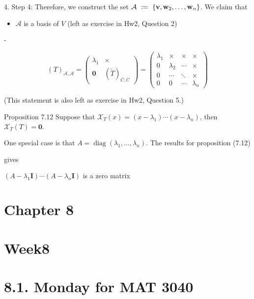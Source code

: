 \documentclass[11pt]{article}
\begin{document}
4. Step 4: Therefore, we construct the set \(\mathcal{A} \mathrel{\text{ := }} \left\{  {\mathbf{v},{\bf w}_2,\ldots ,{\bf w}_n}\right\}\). We claim that

\begin{itemize}
\item \(\mathcal{A}\) is a basis of \(V\) (left as exercise in Hw2, Question 2)
\end{itemize}

-

\[
{\left( T\right) }_{\mathcal{A},\mathcal{A}} = \left( \begin{matrix} {\lambda }_1 &  \times  \\  \mathbf{0} & {\left( \widetilde{T}\right) }_{\bar{C},\bar{C}} \end{matrix}\right)  = \left( \begin{matrix} {\lambda }_1 &  \times  &  \times  &  \times  \\  0 & {\lambda }_2 & \cdots &  \times  \\  0 & \cdots &  \ddots  &  \times  \\  0 & 0 & \cdots & {\lambda }_n \end{matrix}\right)
\]

(This statement is also left as exercise in Hw2, Question 5.)

Proposition 7.12 Suppose that \({\mathcal{X}}_{T}\left( x\right)  = \left( {x - {\lambda }_1}\right) \cdots \left( {x - {\lambda }_n}\right)\), then \({\mathcal{X}}_{T}\left( T\right)  = \mathbf{0}\).

One special case is that \(A = \operatorname{diag}\left( {{\lambda }_1,\ldots ,{\lambda }_n}\right)\). The results for proposition (7.12)

gives

\(\left( {A - {\lambda }_1\mathbf{I}}\right) \cdots \left( {A - {\lambda }_n\mathbf{I}}\right)\) is a zero matrix

\section*{Chapter 8}

\section*{Week8}

\section*{8.1. Monday for MAT 3040}
\end{document}
